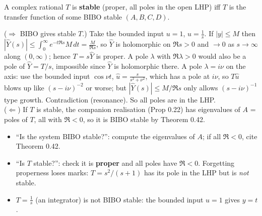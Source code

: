 \begin{thmbox}[title={Theorem 0.45 (frame 170): stable $T$ $\iff$ BIBO stable realisation}]
A complex rational $T$ is \textbf{stable} (proper, all poles in the open LHP) iff $T$ is the transfer function of some BIBO stable $(A,B,C,D)$.
\end{thmbox}
\begin{proofbox}[title={Proof outline of Theorem 0.45}]
($\Rightarrow$ BIBO gives stable $T$.) Take the bounded input $u=1$, $\hat u=\frac1s$. If $|y|\le M$ then $|\hat Y(s)|\le\int_0^\infty e^{-t\Re s}M\,dt=\frac{M}{\Re s}$, so $\hat Y$ is holomorphic on $\Re s>0$ and $\to0$ as $s\to\infty$ along $(0,\infty)$; hence $T=s\hat Y$ is proper.
A pole $\lambda$ with $\Re\lambda>0$ would also be a pole of $\hat Y=T/s$, impossible since $\hat Y$ is holomorphic there.
A pole $\lambda=i\nu$ on the axis: use the bounded input $\cos\nu t$, $\hat u=\frac{s}{s^2+\nu^2}$, which has a pole at $i\nu$, so $T\hat u$ blows up like $(s-i\nu)^{-2}$ or worse; but $|\hat Y(s)|\le M/\Re s$ only allows $(s-i\nu)^{-1}$ type growth. Contradiction (resonance). So all poles are in the LHP.\\
($\Leftarrow$) If $T$ is stable, the companion realisation (Prop 0.22) has eigenvalues of $A$ = poles of $T$, all with $\Re<0$, so it is BIBO stable by Theorem 0.42.
\end{proofbox}
\begin{exambox}
\begin{itemize}
\item ``Is the system BIBO stable?'': compute the eigenvalues of $A$; if all $\Re<0$, cite Theorem 0.42.
\item ``Is $T$ stable?'': check it is \textbf{proper} and all poles have $\Re<0$. Forgetting properness loses marks: $T=s^2/(s+1)$ has its pole in the LHP but is \emph{not} stable.
\item $T=\frac1s$ (an integrator) is not BIBO stable: the bounded input $u=1$ gives $y=t$.
\end{itemize}
\end{exambox}

